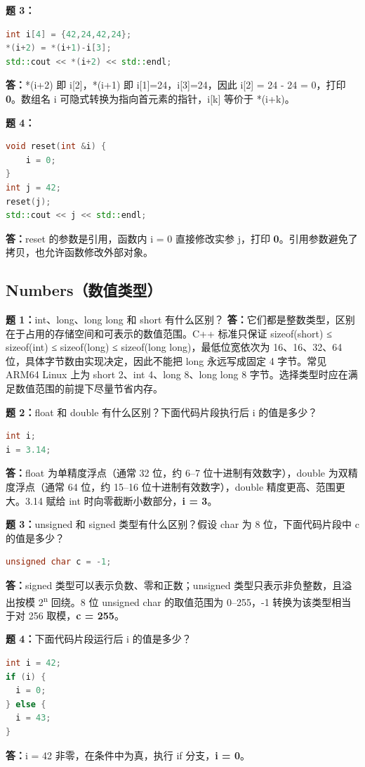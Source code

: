 \documentclass[12pt,a4paper]{ctexart}
\begin{document}
\textbf{题 3：}
\begin{lstlisting}[language=C++]
int i[4] = {42,24,42,24};
*(i+2) = *(i+1)-i[3];
std::cout << *(i+2) << std::endl;
\end{lstlisting}
\textbf{答：}*(i+2) 即 i[2]，*(i+1) 即 i[1]=24，i[3]=24，因此 i[2] = 24 - 24 = 0，打印 \textbf{0}。数组名 i 可隐式转换为指向首元素的指针，i[k] 等价于 *(i+k)。

\textbf{题 4：}
\begin{lstlisting}[language=C++]
void reset(int &i) {
    i = 0;
}
int j = 42;
reset(j);
std::cout << j << std::endl;
\end{lstlisting}
\textbf{答：}reset 的参数是引用，函数内 i = 0 直接修改实参 j，打印 \textbf{0}。引用参数避免了拷贝，也允许函数修改外部对象。

\subsection{Numbers（数值类型）}

\textbf{题 1：}int、long、long long 和 short 有什么区别？
\textbf{答：}它们都是整数类型，区别在于占用的存储空间和可表示的数值范围。C++ 标准只保证 sizeof(short) ≤ sizeof(int) ≤ sizeof(long) ≤ sizeof(long long)，最低位宽依次为 16、16、32、64 位，具体字节数由实现决定，因此不能把 long 永远写成固定 4 字节。常见 ARM64 Linux 上为 short 2、int 4、long 8、long long 8 字节。选择类型时应在满足数值范围的前提下尽量节省内存。

\textbf{题 2：}float 和 double 有什么区别？下面代码片段执行后 i 的值是多少？
\begin{lstlisting}[language=C++]
int i;
i = 3.14;
\end{lstlisting}
\textbf{答：}float 为单精度浮点（通常 32 位，约 6--7 位十进制有效数字），double 为双精度浮点（通常 64 位，约 15--16 位十进制有效数字），double 精度更高、范围更大。3.14 赋给 int 时向零截断小数部分，\textbf{i = 3}。

\textbf{题 3：}unsigned 和 signed 类型有什么区别？假设 char 为 8 位，下面代码片段中 c 的值是多少？
\begin{lstlisting}[language=C++]
unsigned char c = -1;
\end{lstlisting}
\textbf{答：}signed 类型可以表示负数、零和正数；unsigned 类型只表示非负整数，且溢出按模 2\textsuperscript{n} 回绕。8 位 unsigned char 的取值范围为 0--255，-1 转换为该类型相当于对 256 取模，\textbf{c = 255}。

\textbf{题 4：}下面代码片段运行后 i 的值是多少？
\begin{lstlisting}[language=C++]
int i = 42;
if (i) {
  i = 0;
} else {
  i = 43;
}
\end{lstlisting}
\textbf{答：}i = 42 非零，在条件中为真，执行 if 分支，\textbf{i = 0}。
\end{document}
